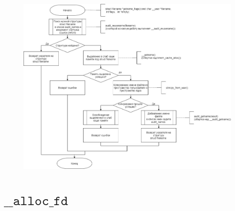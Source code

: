 \documentclass[a4paper,14pt]{extreport}
\begin{document}
\begin{figure}[H]
	\centering
	\includegraphics[scale=0.44]{img/getname_flags.jpg}
	\label{fig:get_name_flags}
\end{figure}






\section{$\texttt{\_\_alloc\_fd}$}
\end{document}
